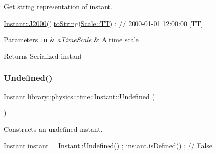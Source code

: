 Get string representation of instant. 


\begin{DoxyCode}
\hyperlink{classlibrary_1_1physics_1_1time_1_1_instant_a2a4f57aa71693b8def06788d55bc3bd3}{Instant::J2000}().\hyperlink{classlibrary_1_1physics_1_1time_1_1_instant_aa3e7ee2c6704053afbf7ed142bb40c4e}{toString}(\hyperlink{namespacelibrary_1_1physics_1_1time_a09d2bc9fbc7b0b5f92e1419bd655e6bbadf1f3edb9115acb0a1e04209b7a9937b}{Scale::TT}) ; \textcolor{comment}{// 2000-01-01 12:00:00 [TT]}
\end{DoxyCode}



\begin{DoxyParams}[1]{Parameters}
\mbox{\tt in}  & {\em a\+Time\+Scale} & A time scale \\
\hline
\end{DoxyParams}
\begin{DoxyReturn}{Returns}
Serialized instant 
\end{DoxyReturn}
\mbox{\label{classlibrary_1_1physics_1_1time_1_1_instant_aae55667866c1d0c4a94650673c6b712c}} 
\subsubsection{\texorpdfstring{Undefined()}{Undefined()}}
{\footnotesize\ttfamily \hyperlink{classlibrary_1_1physics_1_1time_1_1_instant}{Instant} library\+::physics\+::time\+::\+Instant\+::\+Undefined (\begin{DoxyParamCaption}{ }\end{DoxyParamCaption})\hspace{0.3cm}{\ttfamily [static]}}



Constructs an undefined instant. 


\begin{DoxyCode}
\hyperlink{classlibrary_1_1physics_1_1time_1_1_instant_a7916a9d8acb9de4eda35f9d72086a618}{Instant} instant = \hyperlink{classlibrary_1_1physics_1_1time_1_1_instant_aae55667866c1d0c4a94650673c6b712c}{Instant::Undefined}() ;
instant.isDefined() ; \textcolor{comment}{// False}
\end{DoxyCode}


